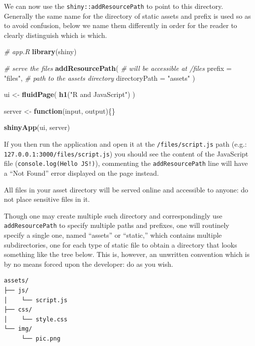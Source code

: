 \documentclass[
]{krantz}
\makeatletter
\newenvironment{Shaded}{\begin{snugshade}}{\end{snugshade}}
\newcommand{\CommentTok}[1]{\textcolor[rgb]{0.37,0.37,0.37}{\textit{#1}}}
\newcommand{\ControlFlowTok}[1]{\textcolor[rgb]{0.27,0.27,0.27}{\textbf{#1}}}
\newcommand{\DataTypeTok}[1]{\textcolor[rgb]{0.27,0.27,0.27}{#1}}
\newcommand{\KeywordTok}[1]{\textcolor[rgb]{0.27,0.27,0.27}{\textbf{#1}}}
\newcommand{\NormalTok}[1]{#1}
\newcommand{\StringTok}[1]{\textcolor[rgb]{0.5,0.5,0.5}{#1}}
\newenvironment{kframe}{%
\medskip{}
\setlength{\fboxsep}{.8em}
 \def\at@end@of@kframe{}%
 \ifinner\ifhmode%
  \def\at@end@of@kframe{\end{minipage}}%
  \begin{minipage}{\columnwidth}%
 \fi\fi%
 \def\FrameCommand##1{\hskip\@totalleftmargin \hskip-\fboxsep
 \colorbox{shadecolor}{##1}\hskip-\fboxsep
     \hskip-\linewidth \hskip-\@totalleftmargin \hskip\columnwidth}%
 \MakeFramed {\advance\hsize-\width
   \@totalleftmargin\z@ \linewidth\hsize
   \@setminipage}}%
 {\par\unskip\endMakeFramed%
 \at@end@of@kframe}
\renewenvironment{Shaded}{\begin{kframe}}{\end{kframe}}
\makeatother
\begin{document}
We can now use the \texttt{shiny::addResourcePath} to point to this directory. Generally the same name for the directory of static assets and prefix is used so as to avoid confusion, below we name them differently in order for the reader to clearly distinguish which is which.

\begin{Shaded}
\begin{Highlighting}[]
\CommentTok{\# app.R}
\KeywordTok{library}\NormalTok{(shiny)}

\CommentTok{\# serve the files}
\KeywordTok{addResourcePath}\NormalTok{(}
  \CommentTok{\# will be accessible at /files}
  \DataTypeTok{prefix =} \StringTok{"files"}\NormalTok{, }
  \CommentTok{\# path to the assets directory}
  \DataTypeTok{directoryPath =} \StringTok{"assets"}
\NormalTok{)}

\NormalTok{ui \textless{}{-}}\StringTok{ }\KeywordTok{fluidPage}\NormalTok{(}
  \KeywordTok{h1}\NormalTok{(}\StringTok{"R and JavaScript"}\NormalTok{)}
\NormalTok{)}

\NormalTok{server \textless{}{-}}\StringTok{ }\ControlFlowTok{function}\NormalTok{(input, output)\{\}}

\KeywordTok{shinyApp}\NormalTok{(ui, server)}
\end{Highlighting}
\end{Shaded}

If you then run the application and open it at the \texttt{/files/script.js} path (e.g.: \texttt{127.0.0.1:3000/files/script.js}) you should see the content of the JavaScript file (\texttt{console.log(\textquotesingle{}Hello\ JS!\textquotesingle{})}), commenting the \texttt{addResourcePath} line will have a ``Not Found'' error displayed on the page instead.

All files in your asset directory will be served online and accessible to anyone: do not place sensitive files in it.

Though one may create multiple such directory and correspondingly use \texttt{addResourcePath} to specify multiple paths and prefixes, one will routinely specify a single one, named ``assets'' or ``static,'' which contains multiple subdirectories, one for each type of static file to obtain a directory that looks something like the tree below. This is, however, an unwritten convention which is by no means forced upon the developer: do as you wish.

\begin{verbatim}
assets/
├── js/
│    └── script.js
├── css/
│    └── style.css
└── img/
     └── pic.png
\end{verbatim}
\end{document}
